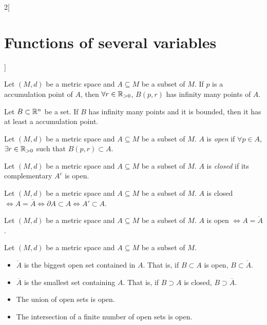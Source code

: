 \documentclass[../../../main.tex]{subfiles}
\begin{document}
\begin{multicols}{2}[\section{Functions of several variables}]
\begin{definition}
    \end{definition}
    \begin{prop}
        Let $(M,d)$ be a metric space and $A\subseteq M$ be a subset of $M$. If $p$ is a accumulation point of $A$, then $\forall r\in\mathbb{R}_{>0}$, $B(p,r)$ has infinity many points of $A$.
    \end{prop}
    \begin{theorem}
        Let $B\subset\mathbb{R}^n$ be a set. If $B$ has infinity many points and it is bounded, then it has at least a accumulation point.
    \end{theorem}
    \begin{definition}
        Let $(M,d)$ be a metric space and $A\subseteq M$ be a subset of $M$. $A$ is \textit{open} if $\forall p\in A$, $\exists r\in\mathbb{R}_{>0}$ such that $B(p,r)\subset A$.
    \end{definition}
    \begin{definition}
        Let $(M,d)$ be a metric space and $A\subseteq M$ be a subset of $M$. $A$ is \textit{closed} if its complementary $A^c$ is open.
    \end{definition}
    \begin{prop}
        Let $(M,d)$ be a metric space and $A\subseteq M$ be a subset of $M$. $A$ is closed $\iff A=\overline{A}\iff\partial A\subset A\iff A'\subset A$.
    \end{prop}
    \begin{prop}
        Let $(M,d)$ be a metric space and $A\subseteq M$ be a subset of $M$. $A$ is open $\iff A=\mathring A$.
    \end{prop}
    \begin{prop}
        Let $(M,d)$ be a metric space and $A\subseteq M$ be a subset of $M$.
        \begin{itemize}
            \item $\mathring A$ is the biggest open set contained in $A$. That is, if $B\subset A$ is open, $B\subset\mathring A$.
            \item $\overline{A}$ is the smallest set containing $A$. That is, if $B\supset A$ is closed, $B\supset\overline{A}$.
        \end{itemize}
    \end{prop}
    \begin{prop}
        \hfill
        \begin{itemize}
            \item The union of open sets is open.
            \item The intersection of a finite number of open sets is open.

\end{itemize}
\end{prop}
\end{multicols}
\end{document}
